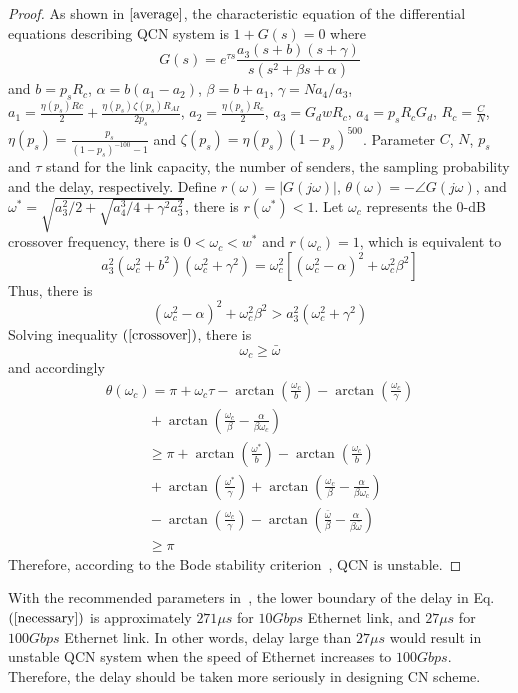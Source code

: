 \documentclass{sig-alternate-10pt}
\begin{document}
\begin{proof}
As shown in $\cite{average}$, the characteristic equation of the differential equations describing QCN system is $1+G(s)=0$ where
\begin{equation}
G(s)=e^{\tau s}\frac{a_3(s+b)(s+\gamma)}{s(s^2+\beta s+\alpha)}
\label{translate}
\end{equation}
and $b=p_sR_c$, $\alpha=b(a_1-a_2)$, $\beta=b+a_1$, $\gamma=Na_4/a_3$, $a_1=\frac{\eta(p_s)Rc}{2}+\frac{\eta(p_s)\zeta(p_s)R_{AI}}{2p_s}$, $a_2=\frac{\eta(p_s)R_c}{2}$, $a_3=G_dwR_c$, $a_4=p_sR_cG_d$, $R_c=\frac{C}{N}$, $\eta(p_s)=\frac{p_s}{(1-p_s)^{-100}-1}$ and $\zeta(p_s)=\eta(p_s)(1-p_s)^{500}$. Parameter $C$, $N$, $p_s$ and $\tau$ stand for the link capacity, the number of senders, the sampling probability and the delay, respectively. Define $r(\omega)=|G(j\omega)|$, $\theta(\omega)=-\angle G(j\omega)$, and $\omega^*=\sqrt{a_3^2/2+\sqrt{a_4^3/4+\gamma^2a_3^2}}$, there is $r(\omega^*)<1$. Let $\omega_c$ represents the 0-dB crossover frequency, there is $0<\omega_c<w^*$ and $r(\omega_c)=1$, which is equivalent to 
\begin{equation}
a_3^2(\omega_c^2+b^2)(\omega_c^2+\gamma^2)=\omega_c^2[(\omega_c^2-\alpha)^2+\omega_c^2\beta^2]
\end{equation}
Thus, there is
\begin{equation}
(\omega_c^2-\alpha)^2+\omega_c^2\beta^2>a_3^2(\omega_c^2+\gamma^2)
\label{crossover}
\end{equation}
Solving inequality $(\ref{crossover})$, there is
\begin{equation}
\omega_c\geq \bar{\omega} 
\label{necessary}
\end{equation}
and accordingly 
\begin{equation}
\begin{array}{l}
\theta(\omega_c)=\pi+\omega_c\tau-\arctan(\frac{\omega_c}{b})-\arctan(\frac{\omega_c}{\gamma}) \\
\quad\quad\quad  +\arctan(\frac{\omega_c}{\beta}-\frac{\alpha}{\beta\omega_c}) \\
\qquad\quad\!\!\!\geq  \pi+\arctan(\frac{\omega^*}{b})-\arctan(\frac{\omega_c}{b}) \\
\quad\quad\quad  +\arctan(\frac{\omega^*}{\gamma})+ \arctan(\frac{\omega_c}{\beta}-\frac{\alpha}{\beta\omega_c})\\
\quad\quad\quad   -\arctan(\frac{\omega_c}{\gamma})-\arctan(\frac{\bar{\omega}}{\beta} -\frac{\alpha}{\beta\bar{\omega}}) \\
\qquad\quad\!\!\!\geq \pi
\end{array}
\end{equation}
Therefore, according to the Bode stability criterion~\cite{stability}, QCN is unstable.
\end{proof}
With the recommended parameters in~\cite{average}, the lower boundary of the delay in Eq. $(\ref{necessary})$ is approximately $271\mu s$ for $10Gbps$ Ethernet link, and $27\mu s$ for $100Gbps$ Ethernet link. In other words, delay large than $27\mu s$ would result in unstable QCN system when the speed of Ethernet increases to $100Gbps$. Therefore, the delay should be taken more seriously in designing CN scheme.
\end{document}
